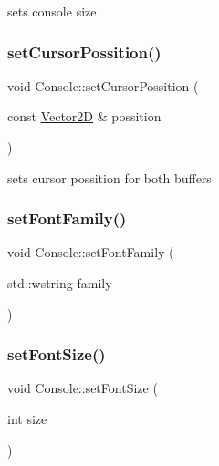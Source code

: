 sets console size 

\mbox{\label{classsc_1_1_console_afbcbbe55d42884df317216f85721afaf}} 
\subsubsection{\texorpdfstring{setCursorPossition()}{setCursorPossition()}}
{\footnotesize\ttfamily void Console\+::set\+Cursor\+Possition (\begin{DoxyParamCaption}\item[{const \mbox{\hyperlink{classsc_1_1_vector2_d}{Vector2D}} \&}]{possition }\end{DoxyParamCaption})}



sets cursor possition for both buffers 

\mbox{\label{classsc_1_1_console_af54de3629d03639be7d4ac3d52709495}} 
\subsubsection{\texorpdfstring{setFontFamily()}{setFontFamily()}}
{\footnotesize\ttfamily void Console\+::set\+Font\+Family (\begin{DoxyParamCaption}\item[{std\+::wstring}]{family }\end{DoxyParamCaption})}

\mbox{\label{classsc_1_1_console_a175546939e190230b6cd02cbc919c216}} 
\subsubsection{\texorpdfstring{setFontSize()}{setFontSize()}}
{\footnotesize\ttfamily void Console\+::set\+Font\+Size (\begin{DoxyParamCaption}\item[{int}]{size }\end{DoxyParamCaption})}

